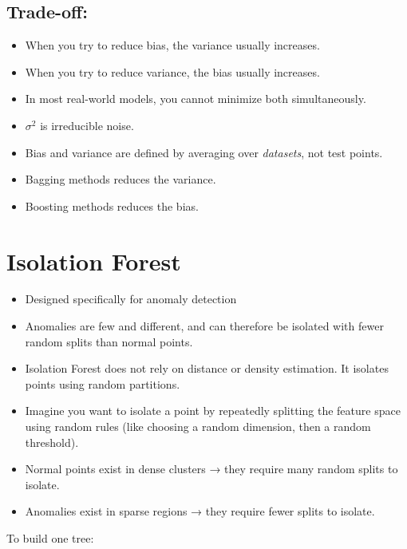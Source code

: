 \documentclass[10pt,a4paper]{article}
\begin{document}
	\subsection{Trade-off:}

	\begin{itemize}
		\item When you try to reduce bias, the variance usually increases.
		\item When you try to reduce variance, the bias usually increases.
		\item In most real-world models, you cannot minimize both simultaneously.
	\end{itemize}

	\begin{itemize}
		\item $\sigma^2$ is irreducible noise.
		\item Bias and variance are defined by averaging over \emph{datasets}, not test points.
		\item Bagging methods reduces the variance.
		\item Boosting methods reduces the bias.
	\end{itemize}

		\section{Isolation Forest}
	
		\begin{itemize}
			\item Designed specifically for anomaly detection
			\item Anomalies are few and different, and can therefore be isolated with fewer random splits than normal points.
			\item Isolation Forest does not rely on distance or density estimation. It isolates points using random partitions.
			\item Imagine you want to isolate a point by repeatedly splitting the feature space using random rules (like choosing a random dimension, then a random threshold).
			\item Normal points exist in dense clusters → they require many random splits to isolate.
			\item Anomalies exist in sparse regions → they require fewer splits to isolate.
		\end{itemize}
	
		To build one tree:
	
\end{document}
